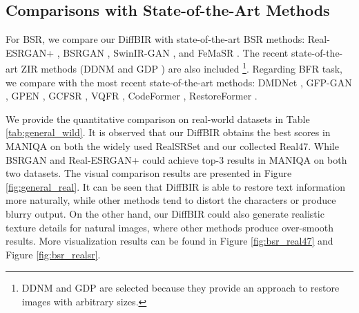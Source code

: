 \documentclass{article}
\begin{document}
\subsection{Comparisons with State-of-the-Art Methods}

For BSR, we compare our DiffBIR with state-of-the-art BSR methods: Real-ESRGAN+ \cite{realesrgan}, BSRGAN \cite{bsrgan}, SwinIR-GAN \cite{swinir}, and FeMaSR \cite{femasr}. The recent state-of-the-art ZIR methods (DDNM \cite{ddnm} and GDP \cite{gdp}) are also included \footnote{DDNM and GDP are selected because they provide an approach to restore images with arbitrary sizes.}.
Regarding BFR task, we compare with the most recent state-of-the-art methods: DMDNet \cite{dmdnet}, GFP-GAN \cite{gfpgan}, GPEN \cite{gpen}, GCFSR \cite{gcfsr}, VQFR \cite{vqfr}, CodeFormer \cite{codeformer}, RestoreFormer \cite{restoreformer}.









We provide the quantitative comparison on real-world datasets in Table \ref{tab:general_wild}.
It is observed that our DiffBIR obtains the best scores in MANIQA on both the widely used RealSRSet \cite{realsr} and our collected Real47. While BSRGAN and Real-ESRGAN+ could achieve top-3 results in MANIQA on both two datasets.
The visual comparison results are presented in Figure \ref{fig:general_real}. It can be seen that DiffBIR is able to restore text information more naturally, while other methods tend to distort the characters or produce blurry output.  
On the other hand, our DiffBIR could also generate realistic texture details for natural images, where other methods produce over-smooth results. More visualization results can be found in Figure \ref{fig:bsr_real47} and Figure \ref{fig:bsr_realsr}.


\vspace{-1em}
\end{document}
